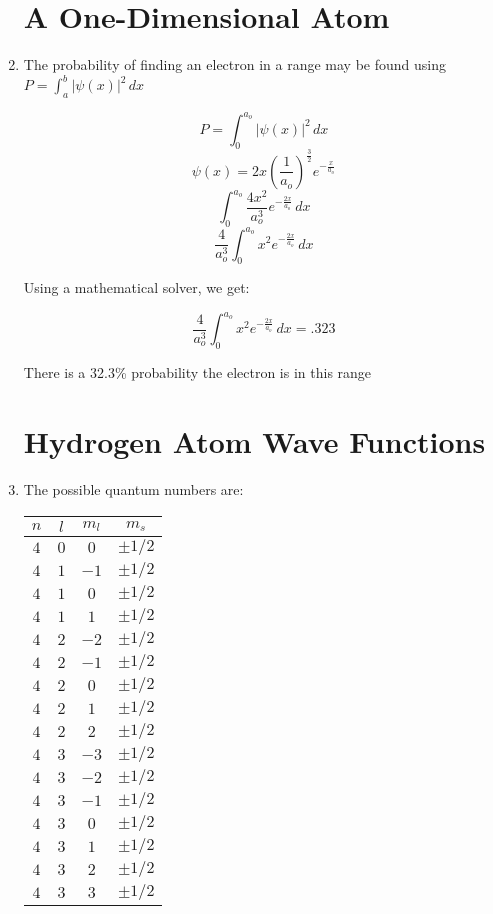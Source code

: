 \begin{enumerate}

    \section*{A One-Dimensional Atom}

  \item The probability of finding an electron in a range may be found using $P=\displaystyle\int_a^b|\psi(x)|^2\,dx$

    $$P=\int_0^{a_o} |\psi(x)|^2\,dx$$
    $$\psi(x)=2x\left( \frac{1}{a_o} \right)^{\frac{3}{2}}e^{-\frac{x}{a_o}}$$
    $$\int_0^{a_o} \frac{4x^2}{a_o^3}e^{-\frac{2x}{a_o}}\, dx$$
    $$\frac{4}{a_o^3}\int_0^{a_o} x^2e^{-\frac{2x}{a_o}}\,dx$$

    Using a mathematical solver, we get:

    $$\frac{4}{a_o^3}\int_0^{a_o} x^2e^{-\frac{2x}{a_o}}\,dx=.323$$

    There is a 32.3\% probability the electron is in this range

    \section*{Hydrogen Atom Wave Functions}

  \item The possible quantum numbers are:

    \begin{center}
      \begin{tabular}[h!]{|c|c|c|c|}
        \hline
        $n$ & $l$ & $m_l$ & $m_s$\\
        \hline
        $4$ & $0$ & $0$ & $\pm1/2$\\
        \hline
        $4$ & $1$ & $-1$ & $\pm1/2$\\
        \hline
        $4$ & $1$ & $0$ & $\pm1/2$\\
        \hline
        $4$ & $1$ & $1$ & $\pm1/2$\\
        \hline
        $4$ & $2$ & $-2$ & $\pm1/2$\\
        \hline
        $4$ & $2$ & $-1$ & $\pm1/2$\\
        \hline
        $4$ & $2$ & $0$ & $\pm1/2$\\
        \hline
        $4$ & $2$ & $1$ & $\pm1/2$\\
        \hline
        $4$ & $2$ & $2$ & $\pm1/2$\\
        \hline
        $4$ & $3$ & $-3$ & $\pm1/2$\\
        \hline
        $4$ & $3$ & $-2$ & $\pm1/2$\\
        \hline
        $4$ & $3$ & $-1$ & $\pm1/2$\\
        \hline
        $4$ & $3$ & $0$ & $\pm1/2$\\
        \hline
        $4$ & $3$ & $1$ & $\pm1/2$\\
        \hline
        $4$ & $3$ & $2$ & $\pm1/2$\\
        \hline
        $4$ & $3$ & $3$ & $\pm1/2$\\
        \hline
      \end{tabular}
    \end{center}


\end{enumerate}
